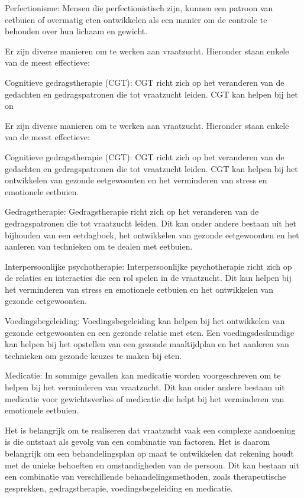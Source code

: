 Perfectionisme: Mensen die perfectionistisch zijn, kunnen een patroon van eetbuien of overmatig eten ontwikkelen als een manier om de controle te behouden over hun lichaam en gewicht.

Er zijn diverse manieren om te werken aan vraatzucht. Hieronder staan enkele van de meest effectieve:

Cognitieve gedragstherapie (CGT): CGT richt zich op het veranderen van de gedachten en gedragspatronen die tot vraatzucht leiden. CGT kan helpen bij het on

Er zijn diverse manieren om te werken aan vraatzucht. Hieronder staan enkele van de meest effectieve:

Cognitieve gedragstherapie (CGT): CGT richt zich op het veranderen van de gedachten en gedragspatronen die tot vraatzucht leiden. CGT kan helpen bij het ontwikkelen van gezonde eetgewoonten en het verminderen van stress en emotionele eetbuien.

Gedragstherapie: Gedragstherapie richt zich op het veranderen van de gedragspatronen die tot vraatzucht leiden. Dit kan onder andere bestaan uit het bijhouden van een eetdagboek, het ontwikkelen van gezonde eetgewoonten en het aanleren van technieken om te dealen met eetbuien.

Interpersoonlijke psychotherapie: Interpersoonlijke psychotherapie richt zich op de relaties en interacties die een rol spelen in de vraatzucht. Dit kan helpen bij het verminderen van stress en emotionele eetbuien en het ontwikkelen van gezonde eetgewoonten.

Voedingsbegeleiding: Voedingsbegeleiding kan helpen bij het ontwikkelen van gezonde eetgewoonten en een gezonde relatie met eten. Een voedingsdeskundige kan helpen bij het opstellen van een gezonde maaltijdplan en het aanleren van technieken om gezonde keuzes te maken bij eten.

Medicatie: In sommige gevallen kan medicatie worden voorgeschreven om te helpen bij het verminderen van vraatzucht. Dit kan onder andere bestaan uit medicatie voor gewichtsverlies of medicatie die helpt bij het verminderen van emotionele eetbuien.

Het is belangrijk om te realiseren dat vraatzucht vaak een complexe aandoening is die ontstaat als gevolg van een combinatie van factoren. Het is daarom belangrijk om een behandelingsplan op maat te ontwikkelen dat rekening houdt met de unieke behoeften en omstandigheden van de persoon. Dit kan bestaan uit een combinatie van verschillende behandelingsmethoden, zoals therapeutische gesprekken, gedragstherapie, voedingsbegeleiding en medicatie.

